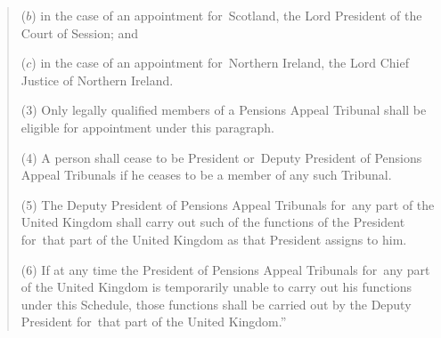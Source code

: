 \documentclass[12pt,a4paper]{article}
\begin{document}
\begin{quotation}
\begin{enumerate}
($b$) in the case of an appointment for~Scotland, the Lord President of the Court of Session; and

($c$) in the case of an appointment for~Northern Ireland, the Lord Chief Justice of Northern Ireland.
\end{enumerate}

(3) Only legally qualified members of a Pensions Appeal Tribunal shall be eligible for appointment under this paragraph.

(4) A person shall cease to be President or~Deputy President of Pensions Appeal Tribunals if he ceases to be a member of any such Tribunal.

(5) The Deputy President of Pensions Appeal Tribunals for~any part of the United Kingdom shall carry out such of the functions of the President for~that part of the United Kingdom as that President assigns to him.

(6) If at any time the President of Pensions Appeal Tribunals for~any part of the United Kingdom is temporarily unable to carry out his functions under this Schedule, those functions shall be carried out by the Deputy President for~that part of the United Kingdom.”
\end{quotation}
\end{document}
